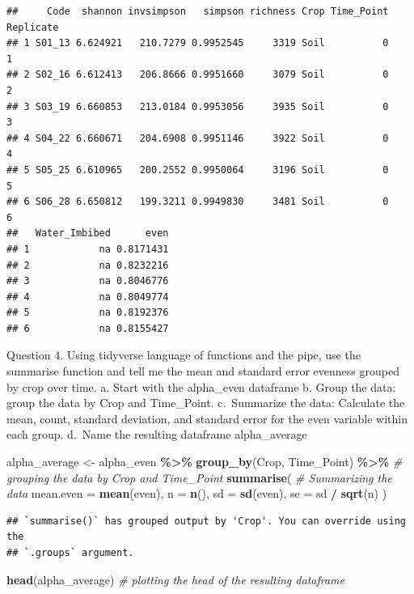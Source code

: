 \documentclass[
]{article}
\newenvironment{Shaded}{\begin{snugshade}}{\end{snugshade}}
\newcommand{\AttributeTok}[1]{\textcolor[rgb]{0.13,0.29,0.53}{#1}}
\newcommand{\CommentTok}[1]{\textcolor[rgb]{0.56,0.35,0.01}{\textit{#1}}}
\newcommand{\FunctionTok}[1]{\textcolor[rgb]{0.13,0.29,0.53}{\textbf{#1}}}
\newcommand{\NormalTok}[1]{#1}
\newcommand{\OtherTok}[1]{\textcolor[rgb]{0.56,0.35,0.01}{#1}}
\newcommand{\SpecialCharTok}[1]{\textcolor[rgb]{0.81,0.36,0.00}{\textbf{#1}}}
\begin{document}
\begin{verbatim}
##     Code  shannon invsimpson   simpson richness Crop Time_Point Replicate
## 1 S01_13 6.624921   210.7279 0.9952545     3319 Soil          0         1
## 2 S02_16 6.612413   206.8666 0.9951660     3079 Soil          0         2
## 3 S03_19 6.660853   213.0184 0.9953056     3935 Soil          0         3
## 4 S04_22 6.660671   204.6908 0.9951146     3922 Soil          0         4
## 5 S05_25 6.610965   200.2552 0.9950064     3196 Soil          0         5
## 6 S06_28 6.650812   199.3211 0.9949830     3481 Soil          0         6
##   Water_Imbibed      even
## 1            na 0.8171431
## 2            na 0.8232216
## 3            na 0.8046776
## 4            na 0.8049774
## 5            na 0.8192376
## 6            na 0.8155427
\end{verbatim}

Question 4. Using tidyverse language of functions and the pipe, use the
summarise function and tell me the mean and standard error evenness
grouped by crop over time. a. Start with the alpha\_even dataframe b.
Group the data: group the data by Crop and Time\_Point. c.~Summarize the
data: Calculate the mean, count, standard deviation, and standard error
for the even variable within each group. d.~Name the resulting dataframe
alpha\_average

\begin{Shaded}
\begin{Highlighting}[]
\NormalTok{alpha\_average }\OtherTok{\textless{}{-}}\NormalTok{ alpha\_even }\SpecialCharTok{\%\textgreater{}\%}
  \FunctionTok{group\_by}\NormalTok{(Crop, Time\_Point) }\SpecialCharTok{\%\textgreater{}\%}    \CommentTok{\# grouping the data by Crop and Time\_Point}
  \FunctionTok{summarise}\NormalTok{(                        }\CommentTok{\# Summarizing the data}
    \AttributeTok{mean.even =} \FunctionTok{mean}\NormalTok{(even),}
    \AttributeTok{n =} \FunctionTok{n}\NormalTok{(),}
    \AttributeTok{sd =} \FunctionTok{sd}\NormalTok{(even),}
    \AttributeTok{se =}\NormalTok{ sd }\SpecialCharTok{/} \FunctionTok{sqrt}\NormalTok{(n)}
\NormalTok{  )}
\end{Highlighting}
\end{Shaded}

\begin{verbatim}
## `summarise()` has grouped output by 'Crop'. You can override using the
## `.groups` argument.
\end{verbatim}

\begin{Shaded}
\begin{Highlighting}[]
\FunctionTok{head}\NormalTok{(alpha\_average)              }\CommentTok{\# plotting the head of the resulting dataframe}
\end{Highlighting}
\end{Shaded}
\end{document}
